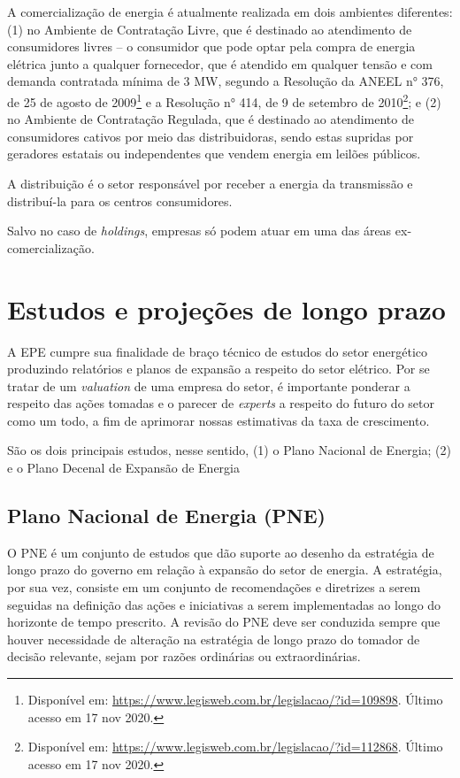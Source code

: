 \documentclass[grad,numbers]{coppe}
\begin{document}
  A comercialização de energia é atualmente realizada em dois ambientes diferentes: (1) no Ambiente de Contratação Livre, que é destinado ao atendimento de consumidores livres -- o consumidor que pode optar pela compra de energia elétrica junto a qualquer fornecedor, que é atendido em qualquer tensão e com demanda contratada mínima de 3 MW, segundo a Resolução da ANEEL n° 376, de 25 de agosto de 2009\footnote{Disponível em: \url{https://www.legisweb.com.br/legislacao/?id=109898}. Último acesso em 17 nov 2020.} e a Resolução n° 414, de 9 de setembro de 2010\footnote{Disponível em: \url{https://www.legisweb.com.br/legislacao/?id=112868}. Último acesso em 17 nov 2020.}; e (2) no Ambiente de Contratação Regulada, que é destinado ao atendimento de consumidores cativos por meio das distribuidoras, sendo estas supridas por geradores estatais ou independentes que vendem energia em leilões públicos.

  A distribuição é o setor responsável por receber a energia da transmissão e distribuí-la para os centros consumidores.

  Salvo no caso de \emph{holdings}, empresas só podem atuar em uma das áreas ex-comercialização.

  \hypertarget{estudos-e-projeuxe7uxf5es-de-longo-prazo}{%
  \section{Estudos e projeções de longo prazo}\label{estudos-e-projeuxe7uxf5es-de-longo-prazo}}

  A EPE cumpre sua finalidade de braço técnico de estudos do setor energético produzindo relatórios e planos de expansão a respeito do setor elétrico. Por se tratar de um \emph{valuation} de uma empresa do setor, é importante ponderar a respeito das ações tomadas e o parecer de \emph{experts} a respeito do futuro do setor como um todo, a fim de aprimorar nossas estimativas da taxa de crescimento.

  São os dois principais estudos, nesse sentido, (1) o Plano Nacional de Energia; (2) e o Plano Decenal de Expansão de Energia

  \hypertarget{plano-nacional-de-energia-pne}{%
  \subsection{Plano Nacional de Energia (PNE)}\label{plano-nacional-de-energia-pne}}

  O PNE é um conjunto de estudos que dão suporte ao desenho da estratégia de longo prazo do governo em relação à expansão do setor de energia. A estratégia, por sua vez, consiste em um conjunto de recomendações e diretrizes a serem seguidas na definição das ações e iniciativas a serem implementadas ao longo do horizonte de tempo prescrito. A revisão do PNE deve ser conduzida sempre que houver necessidade de alteração na estratégia de longo prazo do tomador de decisão relevante, sejam por razões ordinárias ou extraordinárias.
\end{document}
